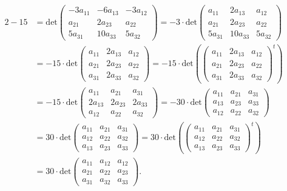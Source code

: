 \documentclass[11pt]{scrartcl}
\begin{document}
\begin{alignat*}{2}
    -15 &= \text{det}
    \begin{pmatrix}
        -3a_{11} & -6a_{13} & -3a_{12} \\
        a_{21} & 2a_{23} & a_{22} \\
        5a_{31} & 10a_{33} & 5a_{32}
    \end{pmatrix}
    = -3\cdot\text{det}
    \begin{pmatrix}
        a_{11} & 2a_{13} & a_{12} \\
        a_{21} & 2a_{23} & a_{22} \\
        5a_{31} & 10a_{33} & 5a_{32}
    \end{pmatrix} \\
    &=-15\cdot\text{det}
    \begin{pmatrix}
        a_{11} & 2a_{13} & a_{12} \\
        a_{21} & 2a_{23} & a_{22} \\
        a_{31} & 2a_{33} & a_{32}
    \end{pmatrix}
    =-15\cdot\text{det}
    \left(\begin{pmatrix}
        a_{11} & 2a_{13} & a_{12} \\
        a_{21} & 2a_{23} & a_{22} \\
        a_{31} & 2a_{33} & a_{32}
    \end{pmatrix}^t\right) \\
    &= -15\cdot\text{det}
    \begin{pmatrix}
        a_{11} & a_{21} & a_{31} \\
        2a_{13} & 2a_{23} & 2a_{33} \\
        a_{12} & a_{22} & a_{32}
    \end{pmatrix}
    = -30\cdot\text{det}
    \begin{pmatrix}
        a_{11} & a_{21} & a_{31} \\
        a_{13} & a_{23} & a_{33} \\
        a_{12} & a_{22} & a_{32}
    \end{pmatrix} \\
    &= 30\cdot \text{det}
    \begin{pmatrix}
        a_{11} & a_{21} & a_{31} \\
        a_{12} & a_{22} & a_{32} \\
        a_{13} & a_{23} & a_{33}
    \end{pmatrix}
    = 30\cdot \text{det}
    \left(
    \begin{pmatrix}
        a_{11} & a_{21} & a_{31} \\
        a_{12} & a_{22} & a_{32} \\
        a_{13} & a_{23} & a_{33}
    \end{pmatrix}^t
    \right) \\
    &=30\cdot \text{det}
    \begin{pmatrix}
        a_{11} & a_{12} & a_{12} \\
        a_{21} & a_{22} & a_{23} \\
        a_{31} & a_{32} & a_{33}
    \end{pmatrix}.
\end{alignat*}
\end{document}
